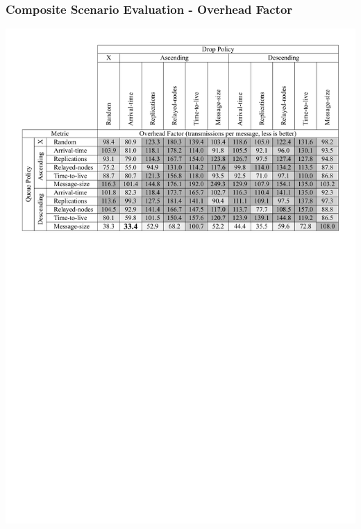 \begin{frame}
  \frametitle{Composite Scenario Evaluation - Overhead Factor}
  \begin{center}
   \includegraphics[width=1.0\textwidth]{fig/tables/scenario4_part2.pdf}
  \end{center}
\end{frame}

